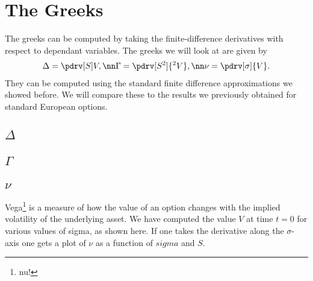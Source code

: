   \section{The Greeks}
  The greeks can be computed by taking the finite-difference derivatives with respect to dependant variables.
  The greeks we will look at are given by
  \begin{align}
    \Delta = \pdrv[S]V,\nn
    \Gamma = \pdrv[S^2]{^2 V},\nn
    \nu = \pdrv[\sigma]{V}.
  \end{align}
  They can be computed using the standard finite difference approximations we showed before. We will compare these to the results we previously obtained for standard European options.
  \subsection{$\Delta$}
  \subsection{$\Gamma$}
  \subsection{$\nu$}
  Vega\footnote{nu!} is a measure of how the value of an option changes with the implied volatility of the underlying asset. We have computed the value $V$ at time $t=0$ for various
  values of sigma, as shown here.
  If one takes the derivative along the $\sigma$-axis one gets a plot of $\nu$ as a function of $sigma$ and $S$.



